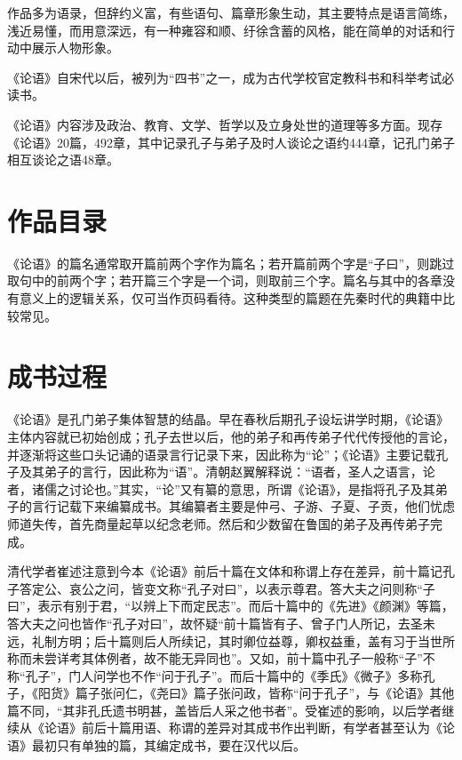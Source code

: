 \documentclass[a4paper,12pt,UTF8,twoside]{ctexbook}
\begin{document}
作品多为语录，但辞约义富，有些语句、篇章形象生动，其主要特点是语言简练，浅近易懂，而用意深远，有一种雍容和顺、纡徐含蓄的风格，能在简单的对话和行动中展示人物形象。

《论语》自宋代以后，被列为“四书”之一，成为古代学校官定教科书和科举考试必读书。

《论语》内容涉及政治、教育、文学、哲学以及立身处世的道理等多方面。现存《论语》20篇，492章，其中记录孔子与弟子及时人谈论之语约444章，记孔门弟子相互谈论之语48章。

\section{作品目录}

《论语》的篇名通常取开篇前两个字作为篇名；若开篇前两个字是“子曰”，则跳过取句中的前两个字；若开篇三个字是一个词，则取前三个字。篇名与其中的各章没有意义上的逻辑关系，仅可当作页码看待。这种类型的篇题在先秦时代的典籍中比较常见。

\section{成书过程}

《论语》是孔门弟子集体智慧的结晶。早在春秋后期孔子设坛讲学时期，《论语》主体内容就已初始创成；孔子去世以后，他的弟子和再传弟子代代传授他的言论，并逐渐将这些口头记诵的语录言行记录下来，因此称为“论”；《论语》主要记载孔子及其弟子的言行，因此称为“语”。清朝赵翼解释说：“语者，圣人之语言，论者，诸儒之讨论也。”其实，“论”又有纂的意思，所谓《论语》，是指将孔子及其弟子的言行记载下来编纂成书。其编纂者主要是仲弓、子游、子夏、子贡，他们忧虑师道失传，首先商量起草以纪念老师。然后和少数留在鲁国的弟子及再传弟子完成。

清代学者崔述注意到今本《论语》前后十篇在文体和称谓上存在差异，前十篇记孔子答定公、哀公之问，皆变文称“孔子对曰”，以表示尊君。答大夫之问则称“子曰”，表示有别于君，“以辨上下而定民志”。而后十篇中的《先进》《颜渊》等篇，答大夫之问也皆作“孔子对曰”，故怀疑“前十篇皆有子、曾子门人所记，去圣未远，礼制方明；后十篇则后人所续记，其时卿位益尊，卿权益重，盖有习于当世所称而未尝详考其体例者，故不能无异同也”。又如，前十篇中孔子一般称“子”不称“孔子”，门人问学也不作“问于孔子”。而后十篇中的《季氏》《微子》多称孔子，《阳货》篇子张问仁，《尧曰》篇子张问政，皆称“问于孔子”，与《论语》其他篇不同，“其非孔氏遗书明甚，盖皆后人采之他书者”。受崔述的影响，以后学者继续从《论语》前后十篇用语、称谓的差异对其成书作出判断，有学者甚至认为《论语》最初只有单独的篇，其编定成书，要在汉代以后。
\end{document}
